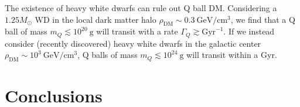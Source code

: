 \documentclass[11 pt,preprint,preprintnumbers,amsmath,amssymb, prd]{revtex4}
\begin{document}
The existence of heavy white dwarfs can rule out Q ball DM. Considering a $1.25 M_{\odot}$ WD in the local dark matter halo $\rho_{\text{DM}} \sim 0.3 ~\text{GeV}/\text{cm}^3$, we find that a Q ball of mass $m_Q \lesssim 10^{20} ~\text{g}$ will transit with a rate $\Gamma_Q \gtrsim \text{Gyr}^{-1}$. If we instead consider (recently discovered) heavy white dwarfs in the galactic center $\rho_{\text{DM}} \sim 10^3 ~\text{GeV}/\text{cm}^3$, Q balls of mass $m_Q \lesssim 10^{24} ~\text{g}$ will transit within a Gyr.

\section{Conclusions}

\end{document}
